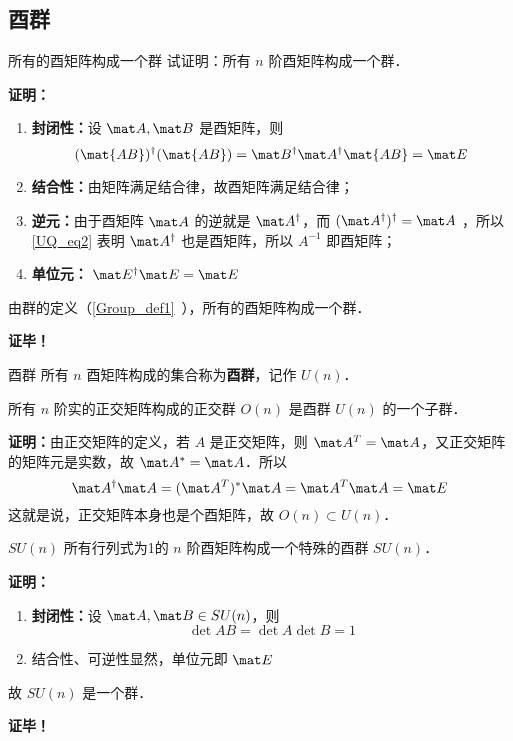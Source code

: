 \subsection{酉群}
\begin{example}{所有的酉矩阵构成一个群}
试证明：所有 $n$ 阶酉矩阵构成一个群．

\textbf{证明：}
\begin{enumerate}
\item \textbf{封闭性：}设 $\mat A,\mat B$ 是酉矩阵，则
\begin{equation}
(\mat{AB})^\dagger(\mat{AB})=\mat B^\dagger \mat A^\dagger\mat{AB}=\mat E
\end{equation}
\item \textbf{结合性：}由矩阵满足结合律，故酉矩阵满足结合律；
\item \textbf{逆元：}由于酉矩阵 $\mat A$ 的逆就是 $\mat A^\dagger$，而 $(\mat A^\dagger)^\dagger=\mat A$ ，所以\autoref{UQ_eq2} 表明 $\mat A^\dagger$ 也是酉矩阵，所以 $A^{-1}$ 即酉矩阵；
\item \textbf{单位元：} $\mat E^\dagger\mat E=\mat E$
\end{enumerate}
由群的定义（\autoref{Group_def1}~），所有的酉矩阵构成一个群．

\textbf{证毕！}
\end{example}
\begin{definition}{酉群}
所有 $n$ 酉矩阵构成的集合称为\textbf{酉群}，记作 $U(n)$．
\end{definition}
\begin{theorem}{}
所有 $n$ 阶实的正交矩阵构成的正交群 $O(n)$ 是酉群 $U(n)$ 的一个子群．
\end{theorem}
\textbf{证明：}由正交矩阵的定义，若 $A$ 是正交矩阵，则 $\mat A^T=\mat A$，又正交矩阵的矩阵元是实数，故 $\mat A^*=\mat A$．所以
\begin{equation}
\mat A^\dagger\mat A=(\mat A^T)^*\mat A=\mat A^T\mat A=\mat E
\end{equation}
这就是说，正交矩阵本身也是个酉矩阵，故 $O(n)\subset U(n)$．
\begin{theorem}{$SU(n)$}
所有行列式为1的 $n$ 阶酉矩阵构成一个特殊的酉群 $SU(n)$．
\end{theorem}
\textbf{证明：}
\begin{enumerate}
\item \textbf{封闭性：}设 $\mat A,\mat B\in SU(n)$，则
\begin{equation}
\det{AB}=\det{A}\det{B}=1
\end{equation}
\item 结合性、可逆性显然，单位元即 $\mat E$
\end{enumerate}
故 $SU(n)$ 是一个群．

\textbf{证毕！}